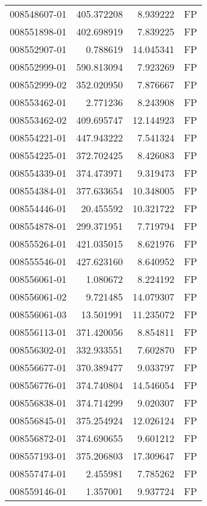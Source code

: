 \begin{tabular}{lrrl}
008548607-01 &  405.372208 &       8.939222 &   FP \\
008551898-01 &  402.698919 &       7.839225 &   FP \\
008552907-01 &    0.788619 &      14.045341 &   FP \\
008552999-01 &  590.813094 &       7.923269 &   FP \\
008552999-02 &  352.020950 &       7.876667 &   FP \\
008553462-01 &    2.771236 &       8.243908 &   FP \\
008553462-02 &  409.695747 &      12.144923 &   FP \\
008554221-01 &  447.943222 &       7.541324 &   FP \\
008554225-01 &  372.702425 &       8.426083 &   FP \\
008554339-01 &  374.473971 &       9.319473 &   FP \\
008554384-01 &  377.633654 &      10.348005 &   FP \\
008554446-01 &   20.455592 &      10.321722 &   FP \\
008554878-01 &  299.371951 &       7.719794 &   FP \\
008555264-01 &  421.035015 &       8.621976 &   FP \\
008555546-01 &  427.623160 &       8.640952 &   FP \\
008556061-01 &    1.080672 &       8.224192 &   FP \\
008556061-02 &    9.721485 &      14.079307 &   FP \\
008556061-03 &   13.501991 &      11.235072 &   FP \\
008556113-01 &  371.420056 &       8.854811 &   FP \\
008556302-01 &  332.933551 &       7.602870 &   FP \\
008556677-01 &  370.389477 &       9.033797 &   FP \\
008556776-01 &  374.740804 &      14.546054 &   FP \\
008556838-01 &  374.714299 &       9.020307 &   FP \\
008556845-01 &  375.254924 &      12.026124 &   FP \\
008556872-01 &  374.690655 &       9.601212 &   FP \\
008557193-01 &  375.206803 &      17.309647 &   FP \\
008557474-01 &    2.455981 &       7.785262 &   FP \\
008559146-01 &    1.357001 &       9.937724 &   FP \\

\end{tabular}
